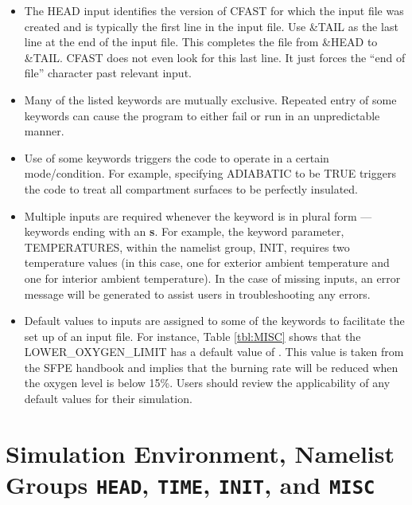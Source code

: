 \begin{itemize}
\item The {\ct HEAD} input identifies the version of CFAST for which the input file was created and is typically the first line in the input file. Use {\ct \&TAIL} as the last line at the end of the input file. This completes the file from {\ct \&HEAD} to {\ct \&TAIL}. CFAST does not even look for this last line. It just forces the “end of file” character past relevant input.
\item Many of the listed keywords are mutually exclusive. Repeated entry of some keywords can cause the program to either fail or run in an unpredictable manner.
\item Use of some keywords triggers the code to operate in a certain mode/condition. For example, specifying {\ct ADIABATIC} to be {\ct TRUE} triggers the code to treat all compartment surfaces to be perfectly insulated.
\item Multiple inputs are required whenever the keyword is in plural form --- keywords ending with an \textbf{s}. For example, the keyword parameter, {\ct TEMPERATURES}, within the namelist group, {\ct INIT}, requires two temperature values (in this case, one for exterior ambient temperature and one for interior ambient temperature). In the case of missing inputs, an error message will be generated to assist users in troubleshooting any errors.
\item Default values to inputs are assigned to some of the keywords to facilitate the set up of an input file. For instance, Table \ref{tbl:MISC} shows that the {\ct LOWER\_OXYGEN\_LIMIT} has a default value of {}. This value is taken from the SFPE handbook \cite{SFPE:2003} and implies that the burning rate will be reduced when the oxygen level is below 15\%. Users should review the applicability of any default values for their simulation.
\end{itemize}


\clearpage

\section{Simulation Environment, Namelist Groups \texorpdfstring{{\tt HEAD}}{HEAD}, \texorpdfstring{{\tt TIME}}{TIME}, \texorpdfstring{{\tt INIT}}{INIT}, and  \texorpdfstring{{\tt MISC}}{MISC}}

